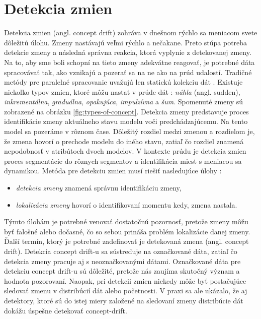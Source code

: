 \section{Detekcia zmien}
Detekcia zmien (angl. concept drift) zohráva v dnešnom rýchlo sa meniacom svete dôležitú úlohu. Zmeny nastávajú veľmi rýchlo a nečakane. Preto stúpa potreba detekcie zmeny a následná správna reakcia, ktorá vyplynie z detekovanej zmeny. Na to, aby sme boli schopní na tieto zmeny adekvátne reagovať, je potrebné dáta spracovávať tak, ako vznikajú a pozerať sa na ne ako na prúd udalostí. Tradičné metódy pre paralelné spracovanie uvažujú len statickú kolekciu dát \citep{tran2014change}. Existuje niekoľko typov zmien, ktoré môžu nastať v prúde dát \citep{wadewale2015survey}: \textit{náhla} (angl. sudden), \textit{inkrementálna}, \textit{graduálna}, \textit{opakujúca}, \textit{impulzívna} a \textit{šum}. Spomenuté zmeny sú zobrazené na obrázku \ref{fig:types-of-concept}.
\label{fig:types-of-concept}
Detekcia zmeny predstavuje proces identifikácie zmeny aktuálneho stavu modelu voči predchádzajúcemu. Na tento model sa pozeráme v rôznom čase. Dôležitý rozdiel medzi zmenou a rozdielom je, že zmena hovorí o prechode modelu do iného stavu, zatiaľ čo rozdiel znamená nepodobnosť v atribútoch dvoch modelov. V kontexte prúdu je detekcia zmien proces segmentácie do rôznych segmentov a identifikácia miest s meniacou sa dynamikou\citep{ross2009online}. Metóda pre detekciu zmien musí riešiť nasledujúce úlohy \citep{tran2014change}: 
\begin{itemize}
	\item \textit{detekcia zmeny} znamená správnu identifikáciu zmeny,
	\item \textit{lokalizácia zmeny} hovorí o identifikovaní momentu kedy, zmena nastala.
\end{itemize}
 Týmto úlohám je potrebné venovať dostatočnú pozornosť, pretože zmeny môžu byť falošné alebo dočasné, čo so sebou prináša problém lokalizácie danej zmeny. Ďalší termín, ktorý je potrebné zadefinovať je detekovaná zmena (angl. concept drift). Detekcia concept drift-u sa sústreďuje na označkované dáta, zatiaľ čo detekcia zmeny pracuje aj s neoznačkovanými dátami. Označkované dáta pre detekciu concept drift-u sú dôležité, pretože nás zaujíma skutočný význam a hodnota pozorovaní. Naopak, pri detekcii zmien niekedy môže byť postačujúce sledovať zmenu v distribúcií dát alebo početnosti. V praxi sa ale ukázalo, že aj detektory, ktoré sú do istej miery založené na sledovaní zmeny distribúcie dát dokážu úspešne detekovať concept-drift.
